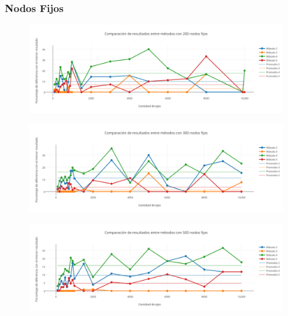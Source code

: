   
\newpage  
  
\subsubsection*{Nodos Fijos}

  \begin{figure}[h!]
   \begin{center}
 	\includegraphics[scale=0.55]{imagenes/local/resultados/200nodos.png}
   \end{center}
 \end{figure}
 
  \begin{figure}[h!]
   \begin{center}
 	\includegraphics[scale=0.55]{imagenes/local/resultados/300nodos.png}
   \end{center}
 \end{figure}
 

  \begin{figure}[h!]
   \begin{center}
 	\includegraphics[scale=0.55]{imagenes/local/resultados/500nodos.png}
   \end{center}
 \end{figure}
 
